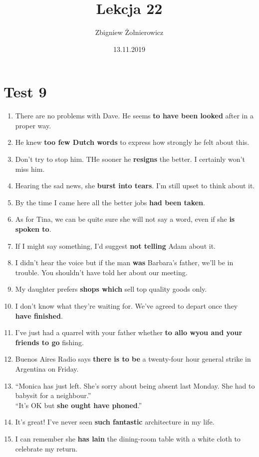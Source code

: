 \documentclass[a4paper]{article}
\begin{document}
\title{{\huge Lekcja 22} \\
{\large }}
\author{Zbigniew Żołnierowicz}
\date{13.11.2019}
\maketitle
\section{Test 9}
\begin{enumerate}
    \item There are no problems with Dave. He seems {\bf to have been looked} after in a proper way.
    \item He knew {\bf too few Dutch words} to express how strongly he felt about this.
    \item Don't try to stop him. THe sooner he {\bf resigns} the better. I certainly won't miss him.
    \item Hearing the sad news, she {\bf burst into tears}. I'm still upset to think about it.
    \item By the time I came here all the better jobs {\bf had been taken}.
    \item As for Tina, we can be quite sure she will not say a word, even if she {\bf is spoken to}.
    \item If I might say something, I'd suggest {\bf not telling} Adam about it.
    \item I didn't hear the voice but if the man {\bf was} Barbara's father, we'll be in trouble. You shouldn't have told her about our meeting.
    \item My daughter prefers {\bf shops which} sell top quality goods only.
    \item I don't know what they're waiting for. We've agreed to depart once they {\bf have finished}.
    \item I've just had a quarrel with your father whether {\bf to allo wyou and your friends to go} fishing.
    \item Buenos Aires Radio says {\bf there is to be} a twenty-four hour general strike in Argentina on Friday.
    \item ``Monica has just left. She's sorry about being absent last Monday. She had to babysit for a neighbour.'' \\
    ``It's OK but {\bf she ought have phoned}.''
    \item It's great! I've never seen {\bf such fantastic} architecture in my life.
    \item I can remember she {\bf has lain} the dining-room table with a white cloth to celebrate my return.
\end{enumerate}
\end{document}
